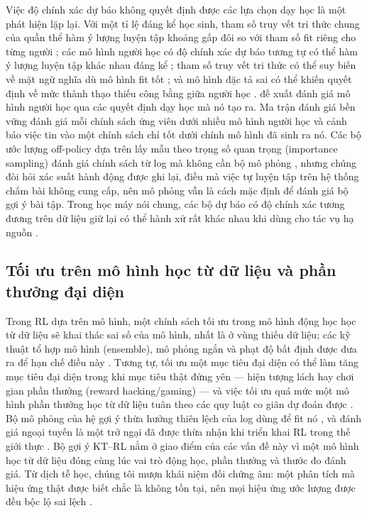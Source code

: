 Việc độ chính xác dự báo không quyết định được các lựa chọn dạy học là một phát hiện lặp lại. Với một tỉ lệ đáng kể học sinh, tham số truy vết tri thức chung của quần thể hàm ý lượng luyện tập khoảng gấp đôi so với tham số fit riêng cho từng người \citep{lee2012individualizing}; các mô hình người học có độ chính xác dự báo tương tự có thể hàm ý lượng luyện tập khác nhau đáng kể \citep{rollinson2015predictive}; tham số truy vết tri thức có thể suy biến về mặt ngữ nghĩa dù mô hình fit tốt \citep{doroudi2017identifiability}; và mô hình đặc tả sai có thể khiến quyết định về mức thành thạo thiếu công bằng giữa người học \citep{doroudi2019fairer}. \citet{gonzalezbrenes2015leopard} đề xuất đánh giá mô hình người học qua các quyết định dạy học mà nó tạo ra. Ma trận đánh giá bền vững \citep{doroudi2017rem} đánh giá mỗi chính sách ứng viên dưới nhiều mô hình người học và cảnh báo việc tin vào một chính sách chỉ tốt dưới chính mô hình đã sinh ra nó. Các bộ ước lượng off-policy dựa trên lấy mẫu theo trọng số quan trọng (importance sampling) đánh giá chính sách từ log mà không cần bộ mô phỏng \citep{mandel2014offline,thomas2016dataefficient}, nhưng chúng đòi hỏi xác suất hành động được ghi lại, điều mà việc tự luyện tập trên hệ thống chấm bài không cung cấp, nên mô phỏng vẫn là cách mặc định để đánh giá bộ gợi ý bài tập. Trong học máy nói chung, các bộ dự báo có độ chính xác tương đương trên dữ liệu giữ lại có thể hành xử rất khác nhau khi dùng cho tác vụ hạ nguồn \citep{breiman2001two,damour2022underspecification}.

\subsection{Tối ưu trên mô hình học từ dữ liệu và phần thưởng đại diện}

Trong RL dựa trên mô hình, một chính sách tối ưu trong mô hình động học học từ dữ liệu sẽ khai thác sai số của mô hình, nhất là ở vùng thiếu dữ liệu; các kỹ thuật tổ hợp mô hình (ensemble), mô phỏng ngắn và phạt độ bất định được đưa ra để hạn chế điều này \citep{kurutach2018metrpo,janner2019trust,yu2020mopo,moerland2023mbrl,levine2020offline}. Tương tự, tối ưu một mục tiêu đại diện có thể làm tăng mục tiêu đại diện trong khi mục tiêu thật đứng yên — hiện tượng lách hay chơi gian phần thưởng (reward hacking/gaming) \citep{amodei2016concrete,skalse2022reward} — và việc tối ưu quá mức một mô hình phần thưởng học từ dữ liệu tuân theo các quy luật co giãn dự đoán được \citep{gao2023scaling}. Bộ mô phỏng của hệ gợi ý thừa hưởng thiên lệch của log dùng để fit nó \citep{huang2020keeping}, và đánh giá ngoại tuyến là một trở ngại đã được thừa nhận khi triển khai RL trong thế giới thực \citep{dulacarnold2021challenges}. Bộ gợi ý KT--RL nằm ở giao điểm của các vấn đề này vì một mô hình học từ dữ liệu đóng cùng lúc vai trò động học, phần thưởng và thước đo đánh giá. Từ dịch tễ học, chúng tôi mượn khái niệm đối chứng âm: một phân tích mà hiệu ứng thật được biết chắc là không tồn tại, nên mọi hiệu ứng ước lượng được đều bộc lộ sai lệch \citep{lipsitch2010negative,arnold2016negative}.


